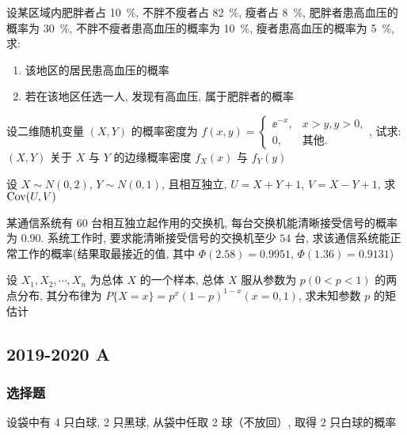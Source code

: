 \begin{ti}[$10$ 分]
	设某区域内肥胖者占 \SI{10}{\percent}, 不胖不瘦者占 \SI{82}{\percent}, 瘦者占 \SI{8}{\percent}, 肥胖者患高血压的概率为 \SI{30}{\percent}, 不胖不瘦者患高血压的概率为 \SI{10}{\percent}, 瘦者患高血压的概率为 \SI{5}{\percent}, 求:
	\begin{enumerate}
		\item 该地区的居民患高血压的概率
		\item 若在该地区任选一人, 发现有高血压, 属于肥胖者的概率
	\end{enumerate}
\end{ti}

\begin{ti}[$10$ 分]
	设二维随机变量 $(X,Y)$ 的概率密度为 $f(x,y)=
	\begin{cases}
		\ee^{-x}, & x>y,y>0,\\
		0, & \text{其他}.
	\end{cases}
	$, 试求: $(X,Y)$ 关于 $X$ 与 $Y$ 的边缘概率密度 $f_X(x)$ 与 $f_Y(y)$
\end{ti}

\begin{ti}[$10$ 分]
	设 $X\sim N(0,2)$, $Y\sim N(0,1)$, 且相互独立, $U=X+Y+1$, $V=X-Y+1$, 求 $\operatorname{Cov}(U,V)$
\end{ti}

\begin{ti}[$10$ 分]
	某通信系统有 $60$ 台相互独立起作用的交换机, 每台交换机能清晰接受信号的概率为 $0.90$. 系统工作时, 要求能清晰接受信号的交换机至少 $54$ 台, 求该通信系统能正常工作的概率(结果取最接近的值, 其中 $\varPhi(2.58)=0.9951$, $\varPhi(1.36)=0.9131$)
\end{ti}

\begin{ti}[$10$ 分]
	设 $X_1,X_2,\cdots,X_n$ 为总体 $X$ 的一个样本, 总体 $X$ 服从参数为 $p(0<p<1)$ 的两点分布, 其分布律为 $P\{ X=x \}=p^x (1-p)^{1-x}(x=0,1)$, 求未知参数 $p$ 的矩估计
\end{ti}

\subsection{2019-2020 A}
\subsubsection{选择题}
\begin{ti}
	设袋中有 4 只白球, 2 只黑球, 从袋中任取 2 球（不放回）, 取得 2 只白球的概率 \kuo{}
\end{ti}

